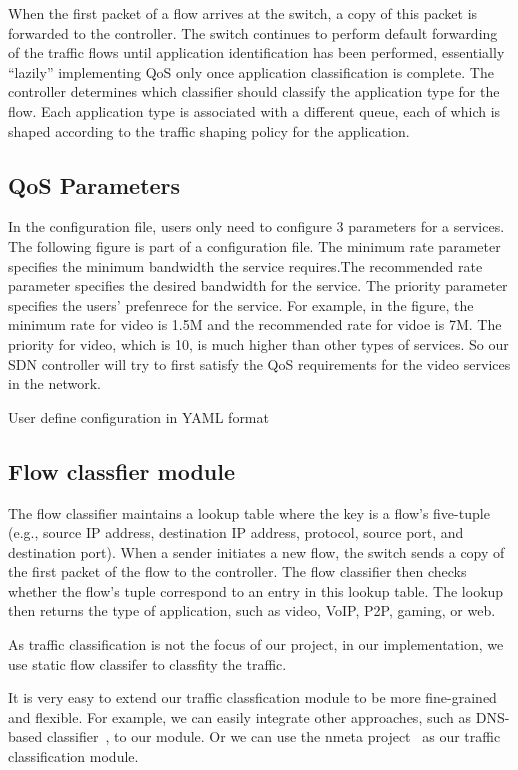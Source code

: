 When the first packet of a flow arrives at the switch, a
copy of this packet is forwarded to the controller. The switch
continues to perform default forwarding of the traffic flows until
application identification has been performed, essentially
“lazily” implementing QoS only once application classification
is complete. The controller determines which classifier
should classify the application type for the flow. Each application
type is associated with a different queue, each of
which is shaped according to the traffic shaping policy for the application.

\subsection{QoS Parameters}
\label{sect:qos params}
In the configuration file, users only need to configure 3 parameters for a services. The following figure is part of a configuration file.
The minimum rate parameter specifies the minimum bandwidth the service requires.The recommended rate parameter specifies the desired bandwidth for the service.
The priority parameter specifies the users' prefenrece for the service.
For example, in the figure, the minimum rate for video is 1.5M and the recommended rate for vidoe is 7M. The priority for video, which is 10, is much higher than other types of services. So our SDN controller will try to first satisfy the QoS requirements for the video services in the network.

User define configuration in YAML format
\subsection{Flow classfier module}
The flow classifier maintains a lookup table where the key is a flow’s five-tuple (e.g., source IP address, destination IP address, protocol, source port, and destination port). When a
sender initiates a new flow, the switch sends a copy of the first packet of the flow to the controller. The flow classifier then checks whether the flow’s tuple correspond to an entry in this lookup table. The lookup then returns the type of application, such as video, VoIP, P2P, gaming, or web.

As traffic classification is not the focus of our project, in our implementation, we use static flow classifer to classfity the traffic.

It is very easy to extend our traffic classfication module to be more fine-grained and flexible. For example, we can easily integrate other approaches, such as DNS-based classifier~\cite{Seddiki_HotSDN14}, to our module. Or we can use the nmeta project~\cite{nmeta} as our traffic classification module.

